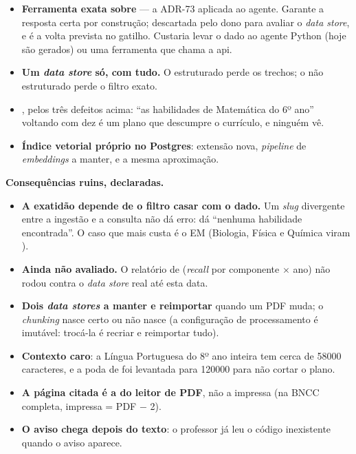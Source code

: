 \begin{itemize}
  \item \textbf{Ferramenta exata sobre } --- a ADR-73 aplicada
    ao agente. Garante a resposta certa por construção; descartada pelo dono para
    avaliar o \emph{data store}, e é a volta prevista no gatilho. Custaria levar
    o dado ao agente Python (hoje são  gerados) ou uma ferramenta que
    chama a api.
  \item \textbf{Um \emph{data store} só, com tudo.} O estruturado perde os
    trechos; o não estruturado perde o filtro exato.
  \item \textbf{}, pelos três defeitos acima: \enquote{as
    habilidades de Matemática do 6º ano} voltando com dez é um plano que
    descumpre o currículo, e ninguém vê.
  \item \textbf{Índice vetorial próprio no Postgres}: extensão nova, \emph{pipeline}
    de \emph{embeddings} a manter, e a mesma aproximação.
\end{itemize}

\textbf{Consequências ruins, declaradas.}

\begin{itemize}
  \item \textbf{A exatidão depende de o filtro casar com o dado.} Um
    \emph{slug} divergente entre a ingestão e a consulta não dá erro: dá
    \enquote{nenhuma habilidade encontrada}. O caso que mais custa é o EM
    (Biologia, Física e Química viram ).
  \item \textbf{Ainda não avaliado.} O relatório de
     (\emph{recall} por componente $\times$
    ano) não rodou contra o \emph{data store} real até esta data.
  \item \textbf{Dois \emph{data stores} a manter e reimportar} quando um PDF
    muda; o \emph{chunking} nasce certo ou não nasce (a configuração de
    processamento é imutável: trocá-la é recriar e reimportar tudo).
  \item \textbf{Contexto caro}: a Língua Portuguesa do 8º ano inteira tem cerca
    de \num{58000} caracteres, e a poda de  foi
    levantada para \num{120000} para não cortar o plano.
  \item \textbf{A página citada é a do leitor de PDF}, não a impressa (na BNCC
    completa, impressa = PDF $-$ 2).
  \item \textbf{O aviso chega depois do texto}: o professor já leu o código
    inexistente quando o aviso aparece.
\end{itemize}

